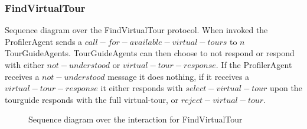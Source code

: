 \documentclass[paper=letter, fontsize=12pt]{article}
\begin{document}
\subsubsection{FindVirtualTour}
Sequence diagram over the FindVirtualTour protocol. When invoked the ProfilerAgent sends a $call-for-available-virtual-tours$ to $n$ TourGuideAgents. TourGuideAgents can then choose to not respond or respond with either $not-understood$ or $virtual-tour-response$. If the ProfilerAgent receives a $not-understood$ message it does nothing, if it receives a $virtual-tour-response$ it either responds with $select-virtual-tour$ upon the tourguide responds with the full virtual-tour, or $reject-virtual-tour$.
\begin{figure}[H]
  \begin{center}
    \caption{Sequence diagram over the interaction for FindVirtualTour}
    \label{fig:find_virtual_tour_sequence}
  \end{center}
\end{figure}
\end{document}
